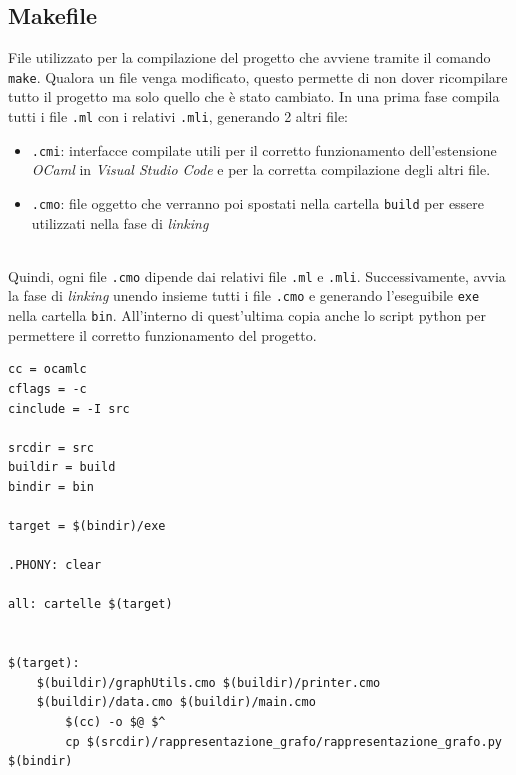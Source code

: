 \subsection{Makefile}

File utilizzato per la compilazione del progetto che avviene tramite il comando \lstinline[style=cmd]|make|. 
Qualora un file venga modificato, questo permette di non dover ricompilare tutto il progetto ma solo quello che è stato cambiato. In una prima fase compila tutti i file \lstinline[style=cmd]|.ml| con i relativi \lstinline[style=cmd]|.mli|, generando 2 altri file:

\begin{itemize}
	\item \lstinline[style=cmd]|.cmi|: interfacce compilate utili per il corretto funzionamento dell'estensione \textit{OCaml} in \textit{Visual Studio Code} e per la corretta compilazione degli altri file.
	\item \lstinline[style=cmd]|.cmo|: file oggetto che verranno poi spostati nella cartella \lstinline[style=cmd]|build| per essere utilizzati nella fase di \textit{linking}
\end{itemize}
\ \\
Quindi, ogni file \lstinline[style=cmd]|.cmo| dipende dai relativi file \lstinline[style=cmd]|.ml| e \lstinline[style=cmd]|.mli|.
Successivamente, avvia la fase di \textit{linking} unendo insieme tutti i file \lstinline[style=cmd]|.cmo| e generando l'eseguibile \lstinline[style=cmd]|exe| nella cartella \lstinline[style=cmd]|bin|. All'interno di quest'ultima copia anche lo script python per permettere il corretto funzionamento del progetto.

\begin{lstlisting}[style=make, caption={Breve estratto del file Makefile}]
cc = ocamlc
cflags = -c
cinclude = -I src

srcdir = src
buildir = build
bindir = bin

target = $(bindir)/exe

.PHONY: clear

all: cartelle $(target)


$(target): 
	$(buildir)/graphUtils.cmo $(buildir)/printer.cmo 
	$(buildir)/data.cmo $(buildir)/main.cmo
		$(cc) -o $@ $^
		cp $(srcdir)/rappresentazione_grafo/rappresentazione_grafo.py $(bindir)

\end{lstlisting}


